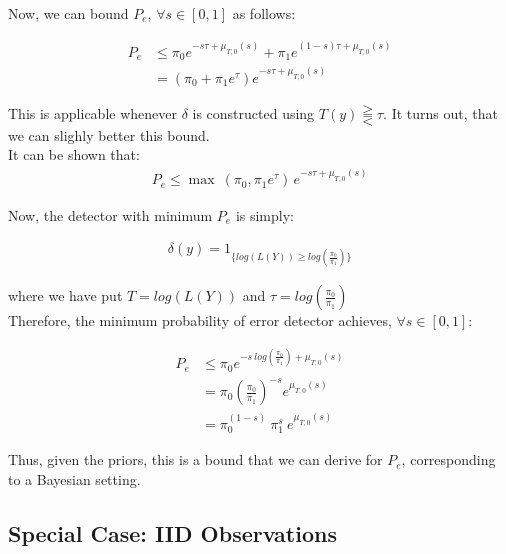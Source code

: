 \documentclass[12pt]{report}
\begin{document}
\noindent Now, we can bound $P_e$,  $\forall s \in [0,1]$  as follows:
 

              \begin{align}
                     P_e&\leq\pi_0 e^{-s\tau + \mu_{T,0}(s) }+\pi_1 e^{(1-s)\tau +  \mu_{T,0}(s)}\nonumber \\
                           &=(\pi_0+\pi_1 e^{\tau}) e^{-s\tau + \mu_{T,0}(s) } 
              \end{align}

\noindent This is applicable whenever $\delta$ is constructed using  $T(y)\gtreqqless\tau$.
                It turns out, that we can slighly better this bound. \\

\noindent It can be shown that: \\
                \begin{align}
                    P_e\leq \max\ (\pi_0, \pi_1 e^{\tau} ) \,  e^{-s \tau + \mu_{T,0}(s)} 
                \end{align}


\noindent Now, the detector with minimum $P_e$ is simply:


                \begin{align}
                      \delta(y) = 1_{ \{ log(L(Y)) \geq log(\frac{\pi_0}{\pi_1})\}}
                \end{align}

\noindent where we have put  $T = log(L(Y))$  and  $ \tau =  log(\frac{\pi_0}{\pi_1}) $ \\

\noindent Therefore, the minimum probability of error detector achieves, $\forall s \in [0,1]$:

               \begin{align}
                        P_e&\leq\pi_0 e^{-s \:  log(\frac{\pi_0}{\pi_1}) +  \mu_{T,0}(s) } \nonumber \\
                              &= \pi_0 (\frac{\pi_0}{\pi_1})^{-s}   e^{\mu_{T,0}(s)}  \nonumber \\             
                              &= \pi_0^{(1-s)} \:  \pi_1^{s} \:  e^{\mu_{T,0}(s)} 
               \end{align}  


\noindent Thus, given the priors, this is a bound that we can derive for $P_e$, corresponding to a Bayesian setting.


\subsection{Special Case: IID Observations}
\end{document}
